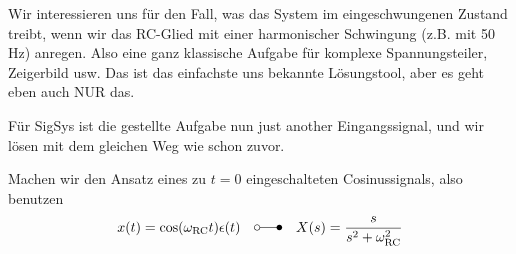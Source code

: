 \documentclass[11pt,a4paper,DIV=12]{scrartcl}
\numberwithin{equation}{section}
\numberwithin{figure}{section}
\begin{document}
\begin{Loesung}
\begin{itemize}
Wir interessieren uns für den Fall, was das System im eingeschwungenen Zustand
treibt, wenn wir das RC-Glied mit einer harmonischer Schwingung (z.B. mit 50 Hz) anregen.
Also eine ganz klassische Aufgabe für komplexe Spannungsteiler, Zeigerbild usw.
Das ist das einfachste uns bekannte Lösungstool, aber es geht eben auch
NUR das.

Für SigSys ist die gestellte Aufgabe nun just another Eingangssignal, und wir lösen
mit dem gleichen Weg wie schon zuvor.

Machen wir den Ansatz eines zu $t=0$ eingeschalteten Cosinussignals, also benutzen
\begin{equation}
x(t)=\cos(\omega_\mathrm{RC} t ) \epsilon(t) \quad \laplace \quad X(s)=\frac{s}{s^2+\omega_\mathrm{RC}^2}
\end{equation}


\end{itemize}
\end{Loesung}
\end{document}
